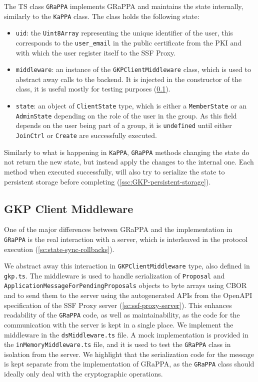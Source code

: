 The TS class \texttt{GRaPPA} implements GRaPPA and maintains the state internally, similarly to the \texttt{KaPPA} class.
The class holds the following state:
\begin{itemize}
    \item \texttt{uid}: the \texttt{Uint8Array} representing the unique identifier of the user, this corresponds to the \texttt{user\_email} in the public certificate from the PKI and with which the user register itself to the SSF Proxy.
    \item \texttt{middleware}: an instance of the \texttt{GKPClientMiddleware} class, which is used to abstract away calls to the backend. It is injected in the constructor of the class, it is useful mostly for testing purposes (\cref{ssc:GKP-client-middleware}).
    \item \texttt{state}: an object of \texttt{ClientState} type, which is either a \texttt{MemberState} or an \texttt{AdminState} depending on the role of the user in the group. As this field depends on the user being part of a group, it is \texttt{undefined} until either \texttt{JoinCtrl} or \texttt{Create} are successfully executed. 
\end{itemize}

Similarly to what is happening in \texttt{KaPPA}, \texttt{GRaPPA} methods changing the state
do not return the new state, but instead apply the changes to the internal one.
Each method when executed successfully, will also try to serialize the state to persistent
storage before completing (\cref{ssc:GKP-persistent-storage}).


\subsection{GKP Client Middleware}\label{ssc:GKP-client-middleware}
One of the major differences between GRaPPA and the implementation in \texttt{GRaPPA}
is the real interaction with a server, which is interleaved in the protocol execution (\cref{sc:state-sync-rollbacks}).

We abstract away this interaction in \texttt{GKPClientMiddleware} type, also
defined in \texttt{gkp.ts}. The middleware is used to handle serialization of
\texttt{Proposal} and \texttt{ApplicationMessageForPendingProposals} objects
to byte arrays using CBOR and to send them to the server using the autogenerated
APIs from the OpenAPI specification of the SSF Proxy server (\cref{sc:ssf-proxy-server}).
This enhances readability of the \texttt{GRaPPA} code, as well as maintainability,
as the code for the communication with the server is kept in a single place.
We implement the middleware in the \texttt{dsMiddleware.ts} file.
A mock implementation is provided in the \texttt{inMemoryMiddleware.ts} file, 
and it is used to test the \texttt{GRaPPA} class in isolation from the server.
We highlight that the serialization code for the message is kept separate
from the implementation of GRaPPA, as the \texttt{GRaPPA} class should ideally only
deal with the cryptographic operations.

